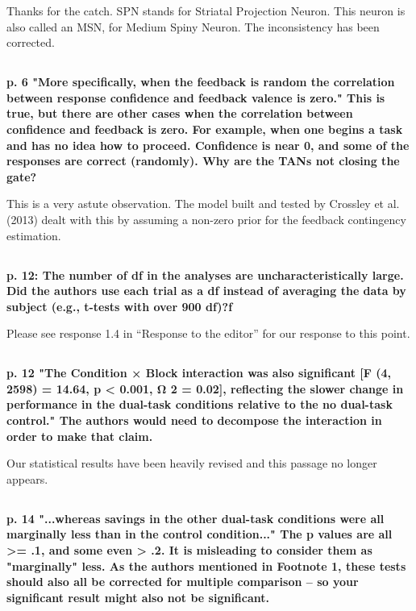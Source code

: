 \documentclass[10pt,a4paper]{article} \usepackage{amsmath} \usepackage{parskip}
\begin{document}
Thanks for the catch. SPN stands for Striatal Projection Neuron. This neuron is
also called an MSN, for Medium Spiny Neuron. The inconsistency has been
corrected.

\subsection{} \textbf{
  p. 6 "More specifically, when the feedback is random the correlation between
  response confidence and feedback valence is zero." This is true, but there are
  other cases when the correlation between confidence and feedback is zero. For
  example, when one begins a task and has no idea how to proceed. Confidence is
  near 0, and some of the responses are correct (randomly). Why are the TANs not
  closing the gate?
}

This is a very astute observation. The model built and tested by Crossley et al.
(2013) dealt with this by assuming a non-zero prior for the feedback contingency
estimation. 

\subsection{} \textbf{
  p. 12: The number of df in the analyses are uncharacteristically large. Did the
  authors use each trial as a df instead of averaging the data by subject (e.g.,
  t-tests with over 900 df)?f
}

Please see response 1.4 in ``Response to the editor'' for our response to this
point.

\subsection{} \textbf{
  p. 12 "The Condition × Block interaction was also significant [F (4, 2598) =
  14.64, p < 0.001, Ω 2 = 0.02], reflecting the slower change in performance in
  the dual-task conditions relative to the no dual-task control." The authors
  would need to decompose the interaction in order to make that claim.
}

Our statistical results have been heavily revised and this passage no longer
appears.

\subsection{} \textbf{
  p. 14 "...whereas savings in the other dual-task
  conditions were all marginally less than in the control condition..." The p
  values are all >= .1, and some even > .2. It is misleading to consider them as
  "marginally" less. As the authors mentioned in Footnote 1, these tests should
  also all be corrected for multiple comparison -- so your significant result
  might also not be significant.
}
\end{document}
